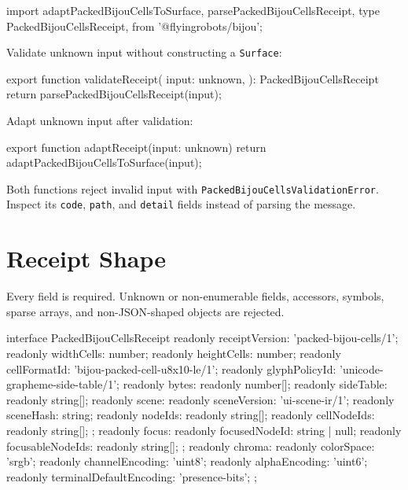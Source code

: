 \begin{CodeBlock}
import {
  adaptPackedBijouCellsToSurface,
  parsePackedBijouCellsReceipt,
  type PackedBijouCellsReceipt,
} from '@flyingrobots/bijou';
\end{CodeBlock}

Validate unknown input without constructing a \texttt{S\allowbreak{}u\allowbreak{}r\allowbreak{}f\allowbreak{}a\allowbreak{}c\allowbreak{}e}:

\begin{CodeBlock}
export function validateReceipt(
  input: unknown,
): PackedBijouCellsReceipt {
  return parsePackedBijouCellsReceipt(input);
}
\end{CodeBlock}

Adapt unknown input after validation:

\begin{CodeBlock}
export function adaptReceipt(input: unknown) {
  return adaptPackedBijouCellsToSurface(input);
}
\end{CodeBlock}

Both functions reject invalid input with \texttt{P\allowbreak{}a\allowbreak{}c\allowbreak{}k\allowbreak{}e\allowbreak{}d\allowbreak{}B\allowbreak{}i\allowbreak{}j\allowbreak{}o\allowbreak{}u\allowbreak{}C\allowbreak{}e\allowbreak{}l\allowbreak{}l\allowbreak{}s\allowbreak{}V\allowbreak{}a\allowbreak{}l\allowbreak{}i\allowbreak{}d\allowbreak{}a\allowbreak{}t\allowbreak{}i\allowbreak{}o\allowbreak{}n\allowbreak{}E\allowbreak{}r\allowbreak{}r\allowbreak{}o\allowbreak{}r}. Inspect its \texttt{c\allowbreak{}o\allowbreak{}d\allowbreak{}e}, \texttt{p\allowbreak{}a\allowbreak{}t\allowbreak{}h}, and \texttt{d\allowbreak{}e\allowbreak{}t\allowbreak{}a\allowbreak{}i\allowbreak{}l} fields instead of parsing the message.

\section{Receipt Shape}\label{record-022-receipt-shape}

Every field is required. Unknown or non-enumerable fields, accessors, symbols, sparse arrays, and non-JSON-shaped objects are rejected.

\begin{CodeBlock}
interface PackedBijouCellsReceipt {
  readonly receiptVersion: 'packed-bijou-cells/1';
  readonly widthCells: number;
  readonly heightCells: number;
  readonly cellFormatId: 'bijou-packed-cell-u8x10-le/1';
  readonly glyphPolicyId: 'unicode-grapheme-side-table/1';
  readonly bytes: readonly number[];
  readonly sideTable: readonly string[];
  readonly scene: {
    readonly sceneVersion: 'ui-scene-ir/1';
    readonly sceneHash: string;
    readonly nodeIds: readonly string[];
    readonly cellNodeIds: readonly string[];
  };
  readonly focus: {
    readonly focusedNodeId: string | null;
    readonly focusableNodeIds: readonly string[];
  };
  readonly chroma: {
    readonly colorSpace: 'srgb';
    readonly channelEncoding: 'uint8';
    readonly alphaEncoding: 'uint6';
    readonly terminalDefaultEncoding: 'presence-bits';
  };
}
\end{CodeBlock}

